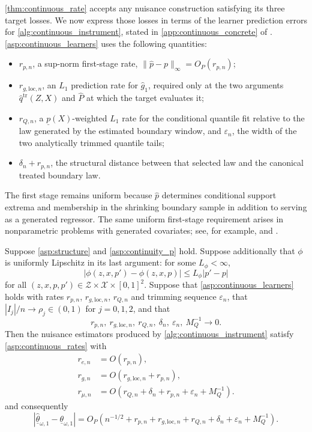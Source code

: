 \cref{thm:continuous_rate} accepts any nuisance construction satisfying its three target losses. We now express those losses in terms of the learner prediction errors for \cref{alg:continuous_instrument}, stated in \cref{app:continuous_concrete} of \supplocation. \cref{asp:continuous_learners} uses the following quantities:
\begin{itemize}
    \item[--] $r_{p,n}$, a sup-norm first-stage rate, $\|\hat p-p\|_\infty=O_P(r_{p,n})$;
    \item[--] $r_{g,\mathrm{loc},n}$, an $L_1$ prediction rate for $\hat g_1$, required only at the two arguments $\hat q^{\mathrm{tr}}(Z,X)$ and $\hat P$ at which the target evaluates it;
    \item[--] $r_{Q,n}$, a $\underline p(X)$-weighted $L_1$ rate for the conditional quantile fit relative to the law generated by the estimated boundary window, and $\varepsilon_n$, the width of the two analytically trimmed quantile tails;
    \item[--] $\delta_n+r_{p,n}$, the structural distance between that selected law and the canonical treated boundary law.
\end{itemize}
The first stage remains uniform because $\hat p$ determines conditional support extrema and membership in the shrinking boundary sample in addition to serving as a generated regressor. The same uniform first-stage requirement arises in nonparametric problems with generated covariates; see, for example, \citet[Assumption 2]{mammen_rothe_schienle2012} and \citet[Assumption 7]{lee2018partial_mean}.

\begin{corollary}\label{cor:continuous_primitive_rate}
    Suppose \cref{asp:structure} and \cref{asp:continuity_p} hold. Suppose additionally that $\phi$ is uniformly Lipschitz in its last argument: for some $L_\phi<\infty$,
    \[
        |\phi(z,x,p')-\phi(z,x,p)|\leqslant L_\phi|p'-p|
    \]
    for all $(z,x,p,p')\in\mathcal Z\times\mathcal X\times[0,1]^2$. Suppose that \cref{asp:continuous_learners} holds with rates $r_{p,n}$, $r_{g,\mathrm{loc},n}$, $r_{Q,n}$ and trimming sequence $\varepsilon_n$, that $|I_j|/n\to\rho_j\in(0,1)$ for $j=0,1,2$, and that
    \[
        r_{p,n},\ r_{g,\mathrm{loc},n},\ r_{Q,n},\ \delta_n,\ \varepsilon_n,\ M_Q^{-1}\longrightarrow0.
    \]
    Then the nuisance estimators produced by \cref{alg:continuous_instrument} satisfy \cref{asp:continuous_rates} with
    \[
    \begin{aligned}
        r_{e,n}&=O(r_{p,n}),\\
        r_{g,n}&=O\!\left(r_{g,\mathrm{loc},n}+r_{p,n}\right),\\
        r_{\mu,n}&=O\!\left(
          r_{Q,n}+\delta_n+r_{p,n}+\varepsilon_n+M_Q^{-1}\right).
    \end{aligned}
    \]
    and consequently
    \[
        |\hat{\underline\theta}_{\omega,1}-\underline\theta_{\omega,1}|
        =O_P\!\left(n^{-1/2}+r_{p,n}+r_{g,\mathrm{loc},n}
        +r_{Q,n}+\delta_n+\varepsilon_n+M_Q^{-1}\right).
    \]
\end{corollary}

